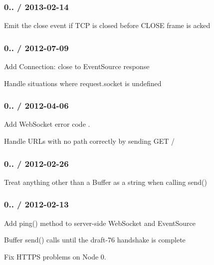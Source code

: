 \subsubsection*{0.. / 2013-\/02-\/14}


\begin{DoxyItemize}
\item Emit the {\ttfamily close} event if T\+CP is closed before C\+L\+O\+SE frame is acked
\end{DoxyItemize}

\subsubsection*{0.. / 2012-\/07-\/09}


\begin{DoxyItemize}
\item Add {\ttfamily Connection\+: close} to Event\+Source response
\item Handle situations where {\ttfamily request.\+socket} is undefined
\end{DoxyItemize}

\subsubsection*{0.. / 2012-\/04-\/06}


\begin{DoxyItemize}
\item Add Web\+Socket error code {}.
\item Handle U\+R\+Ls with no path correctly by sending {\ttfamily G\+ET /}
\end{DoxyItemize}

\subsubsection*{0.. / 2012-\/02-\/26}


\begin{DoxyItemize}
\item Treat anything other than a {\ttfamily Buffer} as a string when calling {\ttfamily send()}
\end{DoxyItemize}

\subsubsection*{0.. / 2012-\/02-\/13}


\begin{DoxyItemize}
\item Add {\ttfamily ping()} method to server-\/side {\ttfamily Web\+Socket} and {\ttfamily Event\+Source}
\item Buffer {\ttfamily send()} calls until the draft-\/76 handshake is complete
\item Fix H\+T\+T\+PS problems on Node 0.
\end{DoxyItemize}

